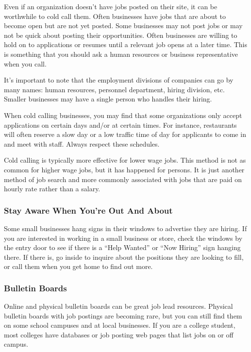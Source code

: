 Even if an organization doesn't have jobs posted on their site, it can be worthwhile to cold call them. Often businesses have jobs that are about to become open but are not yet posted. Some businesses may not post jobs or may not be quick about posting their opportunities. Often businesses are willing to hold on to applications or resumes until a relevant job opens at a later time. This is something that you should ask a human resources or business representative when you call.

It's important to note that the employment divisions of companies can go by many names: human resources, personnel department, hiring division, etc. Smaller businesses may have a single person who handles their hiring.

When cold calling businesses, you may find that some organizations only accept applications on certain days and/or at certain times. For instance, restaurants will often reserve a slow day or a low traffic time of day for applicants to come in and meet with staff. Always respect these schedules.

Cold calling is typically more effective for lower wage jobs. This method is not as common for higher wage jobs, but it has happened for persons. It is just another method of job search and more commonly associated with jobs that are paid on hourly rate rather than a salary.

\subsubsection*{Stay Aware When You're Out And About}

Some small businesses hang signs in their windows to advertise they are hiring. If you are interested in working in a small business or store, check the windows by the entry door to see if there is a ``Help Wanted'' or ``Now Hiring'' sign hanging there. If there is, go inside to inquire about the positions they are looking to fill, or call them when you get home to find out more.

\subsubsection*{Bulletin Boards}

Online and physical bulletin boards can be great job lead resources. Physical bulletin boards with job postings are becoming rare, but you can still find them on some school campuses and at local businesses. If you are a college student, most colleges have databases or job posting web pages that list jobs on or off campus.

